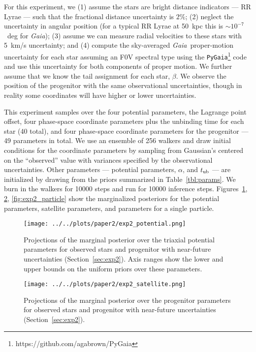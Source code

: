 \documentclass[letterpaper,12pt,preprint]{aastex}
\newcommand{\project}[1]{\textsl{#1}}
\newcommand{\gaia}{\project{Gaia}}
\newcommand{\tub}{t_{\rm ub}}
\newcommand{\Loffset}{\alpha}
\begin{document}
For this experiment, we (1) assume the stars are bright distance indicators --- RR Lyrae --- such that the fractional distance uncertainty is $2\%$; (2) neglect the uncertainty in angular position (for a typical RR Lyrae at 50~kpc this is $\sim$$10^{-7}$~deg for \gaia); (3) assume we can measure radial velocities to these stars with 5~km/s uncertainty; and (4) compute the sky-averaged \gaia\, proper-motion uncertainty for each star assuming an F0V spectral type using the \texttt{PyGaia}\footnote{https://github.com/agabrown/PyGaia} code and use this uncertainty for both components of proper motion. We further assume that we know the tail assignment for each star, $\beta$. We observe the position of the progenitor with the same observational uncertainties, though in reality some coordinates will have higher or lower uncertainties.

This experiment samples over the four potential parameters, the Lagrange point offset, four phase-space coordinate parameters plus the unbinding time for each star (40 total), and four phase-space coordinate parameters for the progenitor --- 49 parameters in total. We use an ensemble of 256 walkers and draw initial conditions for the coordinate parameters by sampling from Gaussian's centered on the ``observed'' value with variances specified by the observational uncertainties. Other parameters --- potential parameters, $\Loffset$, and $\tub$ --- are initialized by drawing from the priors summarized in Table~\ref{tbl:params}. We burn in the walkers for 10000 steps and run for 10000 inference steps. Figures~\ref{fig:exp2_potential}, \ref{fig:exp2_satellite}, \ref{fig:exp2_particle} show the marginalized posteriors for the potential parameters, satellite parameters, and parameters for a single particle. 


\begin{figure}[!ht]
\begin{center}
\texttt{[image: ../../plots/paper2/exp2\_potential.png]}
\caption{ Projections of the marginal posterior over the triaxial potential parameters for observed stars and progenitor with near-future uncertainties (Section~\ref{sec:exp2}). Axis ranges show the lower and upper bounds on the uniform priors over these parameters. }\label{fig:exp2_potential}
\end{center}
\end{figure}

\begin{figure}[!ht]
\begin{center}
\texttt{[image: ../../plots/paper2/exp2\_satellite.png]}
\caption{ Projections of the marginal posterior over the progenitor parameters for observed stars and progenitor with near-future uncertainties (Section~\ref{sec:exp2}). }\label{fig:exp2_satellite}
\end{center}
\end{figure}
\end{document}
